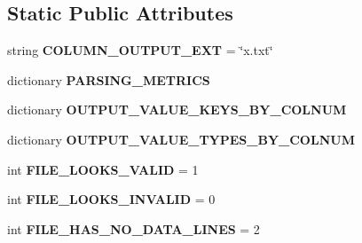 \subsection*{Static Public Attributes}
\begin{DoxyCompactItemize}
\item 
string {\bfseries C\+O\+L\+U\+M\+N\+\_\+\+O\+U\+T\+P\+U\+T\+\_\+\+E\+XT} = \char`\"{}x.\+txt\char`\"{}\hypertarget{classnegui_1_1pgldne2outputparser_1_1PGLDNe2OutputParser_a504996c1aa76bb546dddb9315c31a605}{}\label{classnegui_1_1pgldne2outputparser_1_1PGLDNe2OutputParser_a504996c1aa76bb546dddb9315c31a605}

\item 
dictionary {\bfseries P\+A\+R\+S\+I\+N\+G\+\_\+\+M\+E\+T\+R\+I\+CS}
\item 
dictionary {\bfseries O\+U\+T\+P\+U\+T\+\_\+\+V\+A\+L\+U\+E\+\_\+\+K\+E\+Y\+S\+\_\+\+B\+Y\+\_\+\+C\+O\+L\+N\+UM}
\item 
dictionary {\bfseries O\+U\+T\+P\+U\+T\+\_\+\+V\+A\+L\+U\+E\+\_\+\+T\+Y\+P\+E\+S\+\_\+\+B\+Y\+\_\+\+C\+O\+L\+N\+UM}
\item 
int {\bfseries F\+I\+L\+E\+\_\+\+L\+O\+O\+K\+S\+\_\+\+V\+A\+L\+ID} = 1\hypertarget{classnegui_1_1pgldne2outputparser_1_1PGLDNe2OutputParser_aa36d2032d5c8f5b15a8261e8d7f56f8b}{}\label{classnegui_1_1pgldne2outputparser_1_1PGLDNe2OutputParser_aa36d2032d5c8f5b15a8261e8d7f56f8b}

\item 
int {\bfseries F\+I\+L\+E\+\_\+\+L\+O\+O\+K\+S\+\_\+\+I\+N\+V\+A\+L\+ID} = 0\hypertarget{classnegui_1_1pgldne2outputparser_1_1PGLDNe2OutputParser_a1f97b3d288c62a2a6d549321f48fb5ff}{}\label{classnegui_1_1pgldne2outputparser_1_1PGLDNe2OutputParser_a1f97b3d288c62a2a6d549321f48fb5ff}

\item 
int {\bfseries F\+I\+L\+E\+\_\+\+H\+A\+S\+\_\+\+N\+O\+\_\+\+D\+A\+T\+A\+\_\+\+L\+I\+N\+ES} = 2\hypertarget{classnegui_1_1pgldne2outputparser_1_1PGLDNe2OutputParser_ac5b264dbeb2115ca56022c5a76fcd86c}{}\label{classnegui_1_1pgldne2outputparser_1_1PGLDNe2OutputParser_ac5b264dbeb2115ca56022c5a76fcd86c}

\end{DoxyCompactItemize}



